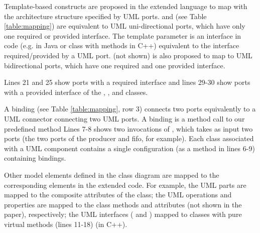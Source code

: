 \noindent
{}
Template-based constructs are proposed in the extended language to map with the architecture structure specified by UML ports.
 and  (see Table \ref{table:mapping}) are equivalent to UML uni-directional ports, which have only one required or provided interface.
The  template parameter is an interface in code (e.g.  in Java or class with  methods in C++) equivalent to the interface required/provided by a UML port. 
 (not shown) is also proposed to map to UML bidirectional ports, which have one required and one provided interface.


Lines 21 and 25 show ports with a required interface and lines 29-30 show ports with a provided interface of the , , and  classes.

\noindent
{}
A binding (see Table \ref{table:mapping}, row 3) connects two ports equivalently to a UML connector connecting two UML ports.
A binding is a method call to our predefined method 
Lines 7-8 shows two invocations of , which takes as input two ports (the two ports of the producer and fifo, for example).
Each class associated with a UML component contains a single configuration (as a method in lines 6-9) containing bindings.

Other model elements defined in the class diagram are mapped to the corresponding elements in the extended code.
For example, the  UML parts are mapped to the composite attributes of the  class; the UML operations and properties are mapped to the class methods and attributes (not shown in the paper), respectively; the UML interfaces ( and ) mapped to classes with pure virtual methods (lines 11-18) (in C++). 

